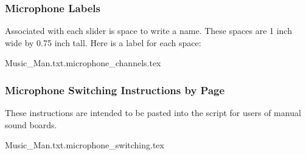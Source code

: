 \documentclass[letterpaper]{article}
\begin{document}
\subsubsection {Microphone Labels}

Associated with each slider is space to write a name.  
These spaces are 1 inch wide by 0.75 inch tall.  
Here is a label for each space:

{\Large
 {Music_Man.txt.microphone_channels.tex}
}

\subsubsection {Microphone Switching Instructions by Page}

These instructions are intended to be pasted into the script
for users of manual sound boards.

 {Music_Man.txt.microphone_switching.tex}
\end{document}
